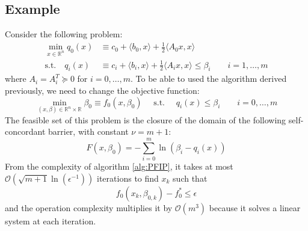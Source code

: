 \documentclass[12pt, openany]{report}
\newcommand{\R}{\mathbb{R}}
\theoremstyle{definition}
\begin{document}
\subsection{Example}
Consider the following problem:
\begin{equation}
	\begin{aligned}
		\min_{x\in \R^n} q_0(x)&\equiv c_0 + \langle b_0,x\rangle + \frac{1}{2}\langle A_0x,x\rangle \\
		\text{s.t.}\quad  q_i(x)&\equiv c_i + \langle b_i,x\rangle + \frac{1}{2}\langle A_ix,x\rangle \le \beta_i \qquad i=1,\dots,m
	\end{aligned}
\end{equation}
where $A_i=A_i^T \succeq 0$ for $i=0,\dots,m$. To be able to used the algorithm derived previously, we need to change the objective function:
\begin{equation}\label{eq:new_prob}
	\min_{(x,\beta)\in \R^n\times \R} \beta_0 \equiv f_0(x,\beta_0) \quad \text{ s.t. }\quad q_i(x) \le \beta_i \qquad i=0,\dots,m
\end{equation}
The feasible set of this problem is the closure of the domain of the following self-concordant barrier, with constant $\nu=m+1$:
\begin{equation}
	F(x,\beta_0) = -\sum_{i=0}^m \ln(\beta_i-q_i(x))
\end{equation}
From the complexity of algorithm \ref{alg:PFIP}, it takes at most $\mathcal{O}\left(\sqrt{m+1}\ln (\epsilon^{-1})\right)$ iterations to find $x_k$ such that 
\begin{equation}
	f_0(x_k,\beta_{0,k}) - f_0^* \le \epsilon
\end{equation}
and the operation complexity multiplies it by $\mathcal{O}(m^3)$ because it solves a linear system at each iteration. 
\end{document}
